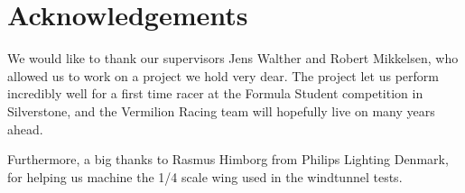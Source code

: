 \chapter*{Acknowledgements}

We would like to thank our supervisors Jens Walther and Robert Mikkelsen, who allowed us to work on a project we hold very dear. The project let us perform incredibly well for a first time racer at the Formula Student competition in Silverstone, and the Vermilion Racing team will hopefully live on many years ahead.

Furthermore, a big thanks to Rasmus Himborg from Philips Lighting Denmark, for helping us machine the 1/4 scale wing used in the windtunnel tests.
